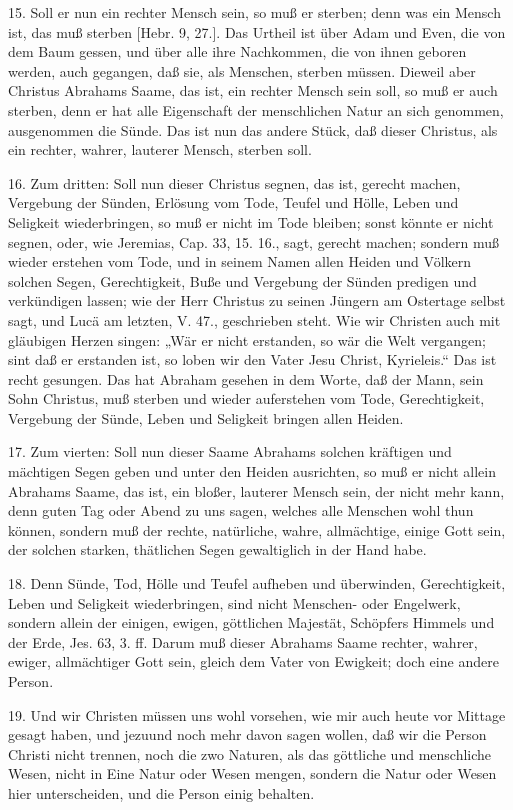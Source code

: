 15. Soll er nun ein rechter Mensch sein, so muß er sterben; denn was ein Mensch ist, das muß sterben [Hebr. 9, 27.]. Das Urtheil ist über Adam und Even, die von dem Baum gessen, und über alle ihre Nachkommen, die von ihnen geboren werden, auch gegangen, daß sie, als Menschen, sterben müssen. Dieweil aber Christus Abrahams Saame, das ist, ein rechter Mensch sein soll, so muß er auch sterben, denn er hat alle Eigenschaft der menschlichen Natur an sich genommen, ausgenommen die Sünde. Das ist nun das andere Stück, daß dieser Christus, als ein rechter, wahrer, lauterer Mensch, sterben soll.

16. Zum dritten: Soll nun dieser Christus segnen, das ist, gerecht machen, Vergebung der Sünden, Erlösung vom Tode, Teufel und Hölle, Leben und Seligkeit wiederbringen, so muß er nicht im Tode bleiben; sonst könnte er nicht segnen, oder, wie Jeremias, Cap. 33, 15. 16., sagt, gerecht machen; sondern muß wieder erstehen vom Tode, und in seinem Namen allen Heiden und Völkern solchen Segen, Gerechtigkeit, Buße und Vergebung der Sünden predigen und verkündigen lassen; wie der Herr Christus zu seinen Jüngern am Ostertage selbst sagt, und Lucä am letzten, V. 47., geschrieben steht. Wie wir Christen auch mit gläubigen Herzen singen: „Wär er nicht erstanden, so wär die Welt vergangen; sint daß er erstanden ist, so loben wir den Vater Jesu Christ, Kyrieleis.“ Das ist recht gesungen. Das hat Abraham gesehen in dem Worte, daß der Mann, sein Sohn Christus, muß sterben und wieder auferstehen vom Tode, Gerechtigkeit, Vergebung der Sünde, Leben und Seligkeit bringen allen Heiden.

17. Zum vierten: Soll nun dieser Saame Abrahams solchen kräftigen und mächtigen Segen geben und unter den Heiden ausrichten, so muß er nicht allein Abrahams Saame, das ist, ein bloßer, lauterer Mensch sein, der nicht mehr kann, denn guten Tag oder Abend zu uns sagen, welches alle Menschen wohl thun können, sondern muß der rechte, natürliche, wahre, allmächtige, einige Gott sein, der solchen starken, thätlichen Segen gewaltiglich in der Hand habe.

18. Denn Sünde, Tod, Hölle und Teufel aufheben und überwinden, Gerechtigkeit, Leben und Seligkeit wiederbringen, sind nicht Menschen- oder Engelwerk, sondern allein der einigen, ewigen, göttlichen Majestät, Schöpfers Himmels und der Erde, Jes. 63, 3. ff. Darum muß dieser Abrahams Saame rechter, wahrer, ewiger, allmächtiger Gott sein, gleich dem Vater von Ewigkeit; doch eine andere Person.

19. Und wir Christen müssen uns wohl vorsehen, wie mir auch heute vor Mittage gesagt haben, und jezuund noch mehr davon sagen wollen, daß wir die Person Christi nicht trennen, noch die zwo Naturen, als das göttliche und menschliche Wesen, nicht in Eine Natur oder Wesen mengen, sondern die Natur oder Wesen hier unterscheiden, und die Person einig behalten.

